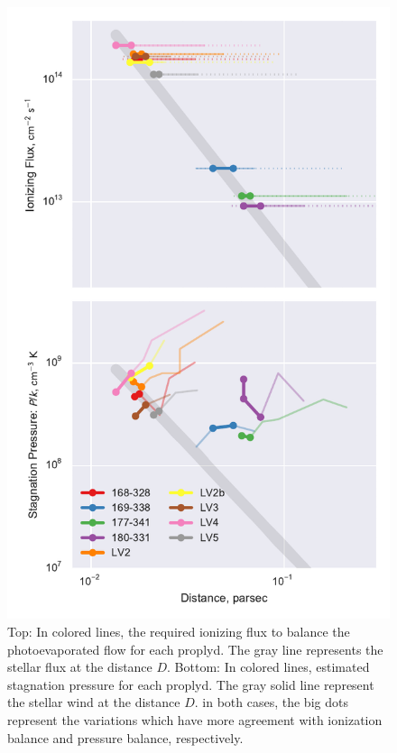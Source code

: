 \begin{figure}
\includegraphics[width=\linewidth]{../../proplyd-wind-figs/plot-wind-fits}
\caption{Top: In colored lines,  the required ionizing flux to balance the photoevaporated flow for each proplyd. The gray line represents the stellar flux at the distance $D$. 
Bottom: In colored lines, estimated stagnation pressure for each proplyd. 
The gray solid line represent the stellar wind at the distance $D$. in both cases, the big dots represent the variations which have more agreement with ionization balance and pressure balance, respectively.}
\label{fig:pressure}
\end{figure}

